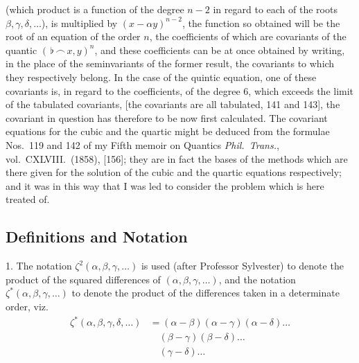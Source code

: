 \documentclass[11pt,a4paper]{book}
\begin{document}
(which product is a function of the degree $n-2$ in regard to each of the roots $\beta,\gamma,\delta,\ldots$), is multiplied by $(x-\alpha y)^{n-2}$, the function so obtained will be the root of an equation of the order $n$, the coefficients of which are covariants of the quantic $(\,\flat\,\frown\, x,y)^n$, and these coefficients can be at once obtained by writing, in the place of the seminvariants of the former result, the covariants to which they respectively belong. In the case of the quintic equation, one of these covariants is, in regard to the coefficients, of the degree 6, which exceeds the limit of the tabulated covariants, [the covariants are all tabulated, 141 and 143], the covariant in question has therefore to be now first calculated. The covariant equations for the cubic and the quartic might be deduced from the formulae Nos.~119 and 142 of my Fifth memoir on Quantics \textit{Phil.\ Trans.}, vol.~CXLVIII.\ (1858), [156]; they are in fact the bases of the methods which are there given for the solution of the cubic and the quartic equations respectively; and it was in this way that I was led to consider the problem which is here treated of.

\subsection*{Definitions and Notation}

1. The notation $\zeta^2(\alpha,\beta,\gamma,\ldots)$ is used (after Professor Sylvester) to denote the product of the squared differences of $(\alpha,\beta,\gamma,\ldots)$, and the notation $\zeta^*(\alpha,\beta,\gamma,\ldots)$ to denote the product of the differences taken in a determinate order, viz.
\begin{align*}
\zeta^*(\alpha,\beta,\gamma,\delta,\ldots) &= (\alpha-\beta)(\alpha-\gamma)(\alpha-\delta)\ldots\\
&\quad(\beta-\gamma)(\beta-\delta)\ldots\\
&\quad(\gamma-\delta)\ldots
\end{align*}
\end{document}
